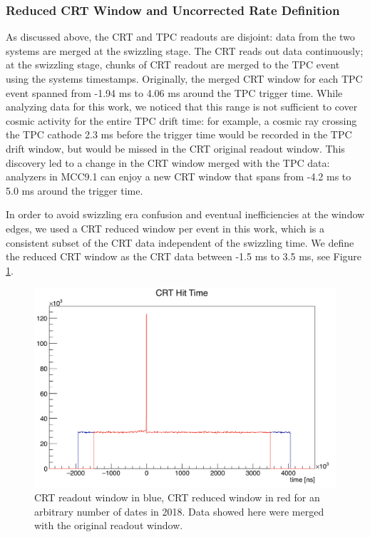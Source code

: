 \subsubsection{Reduced CRT Window and  Uncorrected Rate Definition}\label{sec:RateDef}
As discussed above, the CRT and TPC readouts are disjoint: data from the two systems are merged at the swizzling stage.  
The CRT reads out data continuously; at the swizzling stage, chunks of CRT readout are merged to the TPC event using the systems timestamps.
Originally, the merged CRT window for each TPC event spanned from -1.94 ms to 4.06 ms around the TPC trigger time. While analyzing data for this work, we noticed that this range is not sufficient to cover cosmic activity for the entire TPC drift time: for example, a cosmic ray crossing the TPC cathode 2.3 ms before the trigger time would be recorded in the TPC drift window, but would be missed in the CRT original readout window. This discovery led to a change in the CRT window merged with the TPC data: analyzers in MCC9.1 can enjoy a new CRT window that spans from -4.2 ms to 5.0 ms around the trigger time.

In order to avoid swizzling era confusion and  eventual inefficiencies at the window edges,  we used a CRT reduced window per event in this work, which is a consistent subset of the CRT data independent of the swizzling time. We define the reduced CRT window as the CRT data between -1.5 ms to 3.5 ms, see Figure \ref{fig:ReadOutWindow}. 


\begin{figure}[h!]
\centering
\includegraphics[scale=0.4]{images/window.png}
\caption{CRT readout window in blue, CRT reduced window in red for an arbitrary number of dates in 2018. Data showed here were merged with the original readout window.}
\label{fig:ReadOutWindow}
\end{figure}


